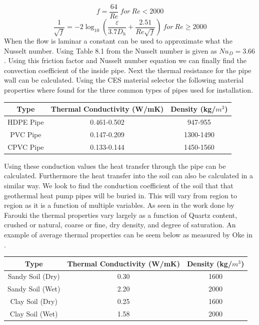 %
\begin{equation}
    f = \frac{64}{Re}\ for\ Re < 2000
\end{equation}
\begin{equation}
    \frac { 1 }{ \sqrt { f }  } =-2\log _{ 10 } \left( \frac { \varepsilon  }{ 3.7D_{ h } } +\frac { 2.51 }{ { Re }\sqrt { f }  }  \right)\ for\ Re \geq 2000
\end{equation}
%
When the flow is laminar a constant can be used to approximate what the Nusselt number. Using Table 8.1 from \cite{bergman2011fundamentals} the Nusselt number is given as ${ N }u_{ D }=3.66$. Using this friction factor and Nusselt number equation we can finally find the convection coefficient of the inside pipe. Next the thermal resistance for the pipe wall can be calculated. Using the CES material selector \cite{ces} the following material properties where found for the three common types of pipes used for installation.
%
\begin{table}[H]
\centering
\begin{tabular}{ccc}
Type       & Thermal Conductivity (W/mK) & Density (kg/$m^3$) \\ \hline
HDPE Pipe  & 0.461-0.502                 & 947-955                          \\
PVC Pipe   & 0.147-0.209                 & 1300-1490                        \\
CPVC Pipe  & 0.133-0.144                 & 1450-1560                       \\
\end{tabular}
\end{table}
%
\noindent
Using these conduction values the heat transfer through the pipe can be calculated. Furthermore the heat transfer into the soil can also be calculated in a similar way. We look to find the conduction coefficient of the soil that that geothermal heat pump pipes will be buried in. This will vary from region to region as it is a function of multiple variables. As seen in the work done by Farouki \cite{farouki1981thermal} the thermal properties vary largely as a function of Quartz content, crushed or natural, coarse or fine, dry density, and degree of saturation. An example of average thermal properties can be seem below as measured by Oke in \cite{oke2002boundary}.
%
\begin{table}[H]
\centering
\begin{tabular}{ccc}
Type             & Thermal Conductivity (W/mK) & Density (kg/$m^3$) \\ \hline
Sandy Soil (Dry) & 0.30                        & 1600               \\
Sandy Soil (Wet) & 2.20                        & 2000               \\
Clay Soil (Dry)  & 0.25                        & 1600               \\
Clay Soil (Wet)  & 1.58                        & 2000              
\end{tabular}
\end{table}
